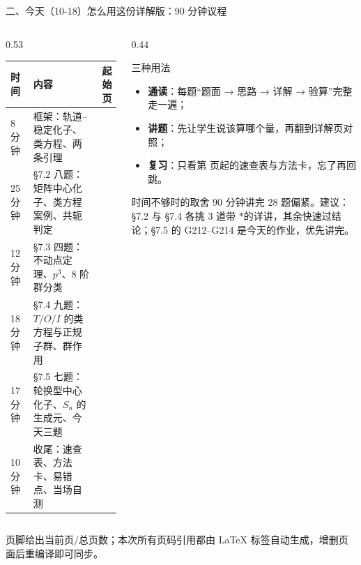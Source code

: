 \documentclass[aspectratio=169,10pt,fontset=none]{ctexbeamer}
\newcommand{\starpt}{\textcolor{accent}{\bfseries$\ast$}}
\begin{document}
\begin{frame}[t]{二、今天（10-18）怎么用这份详解版：90 分钟议程}
  \label{sec:agenda}
  \begin{columns}[T,onlytextwidth]
    \begin{column}{0.53\textwidth}
      \centering
      \scriptsize
      \setlength{\tabcolsep}{2pt}
      \renewcommand{\arraystretch}{1.18}
      \begin{tabular}{@{}l l r@{}}
        \toprule
        时间 & 内容 & 起始页\\
        \midrule
        8 分钟  & 框架：轨道--稳定化子、类方程、两条引理 & \pageref{sec:frame1}\\
        25 分钟 & \S7.2 八题：矩阵中心化子、类方程案例、共轭判定 & \pageref{ex:LA198}\\
        12 分钟 & \S7.3 四题：不动点定理、$p^3$、8 阶群分类 & \pageref{ex:G195}\\
        18 分钟 & \S7.4 九题：$T/O/I$ 的类方程与正规子群、群作用 & \pageref{ex:G199}\\
        17 分钟 & \S7.5 七题：轮换型中心化子、$S_n$ 的生成元、今天三题 & \pageref{ex:G208}\\
        10 分钟 & 收尾：速查表、方法卡、易错点、当场自测 & \pageref{sec:answers}\\
        \bottomrule
      \end{tabular}
    \end{column}
    \begin{column}{0.44\textwidth}
      \begin{block}{\footnotesize 三种用法}
        \scriptsize
        \begin{itemize}\setlength{\itemsep}{1pt}
          \item \textbf{通读}：每题“题面 → 思路 → 详解 → 验算”完整走一遍；
          \item \textbf{讲题}：先让学生说该算哪个量，再翻到详解页对照；
          \item \textbf{复习}：只看第 \pageref{sec:answers} 页起的速查表与方法卡，忘了再回跳。
        \end{itemize}
      \end{block}
      \begin{alertblock}{\footnotesize 时间不够时的取舍}
        \scriptsize
        90 分钟讲完 28 题偏紧。建议：\S7.2 与 \S7.4 各挑 3 道带 \starpt 的详讲，其余快速过结论；\S7.5 的 G212--G214 是今天的作业，优先讲完。
      \end{alertblock}
    \end{column}
  \end{columns}
  \vspace{0.2em}
  {\scriptsize\color{ink!70} 页脚给出当前页/总页数；本次所有页码引用都由 \LaTeX{} 标签自动生成，增删页面后重编译即可同步。}
\end{frame}
\end{document}
